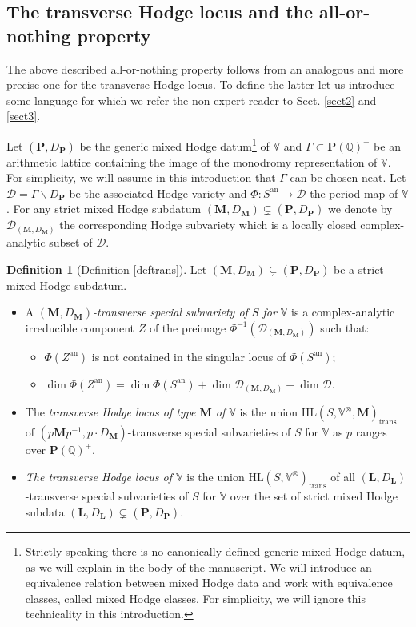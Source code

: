 \documentclass[10pt]{article}
\numberwithin{equation}{subsection}
\theoremstyle{plain}
\theoremstyle{definition}
\newtheorem{definition}[theorem]{Definition}
\theoremstyle{remark}
\newcommand{\Q}{\mathbb Q}
\newcommand{\V}{\mathbb V}
\newcommand{\pp}{\mathbf P}
\newcommand{\M}{\mathbf M}
\newcommand{\LL}{\mathbf L}
\newcommand{\HL}{\mathrm{HL}(S, \V^\otimes)}
\newcommand{\HLM}{\mathrm{HL}(S, \V^\otimes, \M)}
\newcommand{\an}{\mathrm{an}}
\newcommand{\quo}{\backslash}
\newcommand{\period}{\mathscr{D}}
\newcommand{\trans}{\mathrm{trans}}
\begin{document}
\subsection*{The transverse Hodge locus and the all-or-nothing property}
The above described all-or-nothing property follows from an analogous and more precise one for the transverse Hodge locus. To define the latter let us introduce some language for which we refer the non-expert reader to Sect. \ref{sect2} and \ref{sect3}. 

Let $(\pp, D_\pp)$ be the generic mixed Hodge datum\footnote{Strictly speaking there is no canonically defined generic mixed Hodge datum, as we will explain in the body of the manuscript. We will introduce an equivalence relation between mixed Hodge data and work with equivalence classes, called mixed Hodge classes. For simplicity, we will ignore this technicality in this introduction.} of $\V$ and $\Gamma \subset \pp(\Q)^+$ be an arithmetic lattice containing the image of the monodromy representation of $\V$. For simplicity, we will assume in this introduction that $\Gamma$ can be chosen neat. Let $\period = \Gamma \quo D_\pp$ be the associated Hodge variety and $\Phi : S^\an \rightarrow \period$ the period map of $\V$. For any strict mixed Hodge subdatum $(\M, D_\M) \subsetneq (\pp, D_\pp)$ we denote by $\period_{(\M, D_\M)}$ the corresponding Hodge subvariety which is a locally closed complex-analytic subset of $\period$.
\begin{definition}[Definition \ref{deftrans}]
Let $(\M, D_\M) \subsetneq (\pp, D_\pp)$ be a strict mixed Hodge subdatum. 
\begin{itemize}
\item A \textit{$(\M, D_\M)$-transverse special subvariety of $S$ for $\V$} is a complex-analytic irreducible component $Z$ of the preimage $\Phi^{-1}(\period_{(\M, D_\M)})$ such that:
\begin{itemize}
\item[(a)] $\Phi(Z^\an)$ is not contained in the singular locus of $\Phi(S^\an)$;
\item[(b)] $\dim \Phi(Z^\an) = \dim \Phi(S^\an) + \dim \period_{(\M, D_\M)} - \dim \period$.
\end{itemize}
\item The \textit{transverse Hodge locus of type $\M$ of $\V$} is the union $\HLM_\trans$ of $(p\M p^{-1}, p \cdot D_\M)$-transverse special subvarieties of $S$ for $\V$ as $p$ ranges over $\pp(\Q)^+$. 
\item \textit{The transverse Hodge locus of $\V$} is the union $\HL_\trans$ of all $(\LL,D_\LL)$-transverse special subvarieties of $S$ for $\V$ over the set of strict mixed Hodge subdata $(\LL, D_\LL) \subsetneq (\pp, D_\pp)$.
\end{itemize}
\end{definition}
\end{document}
